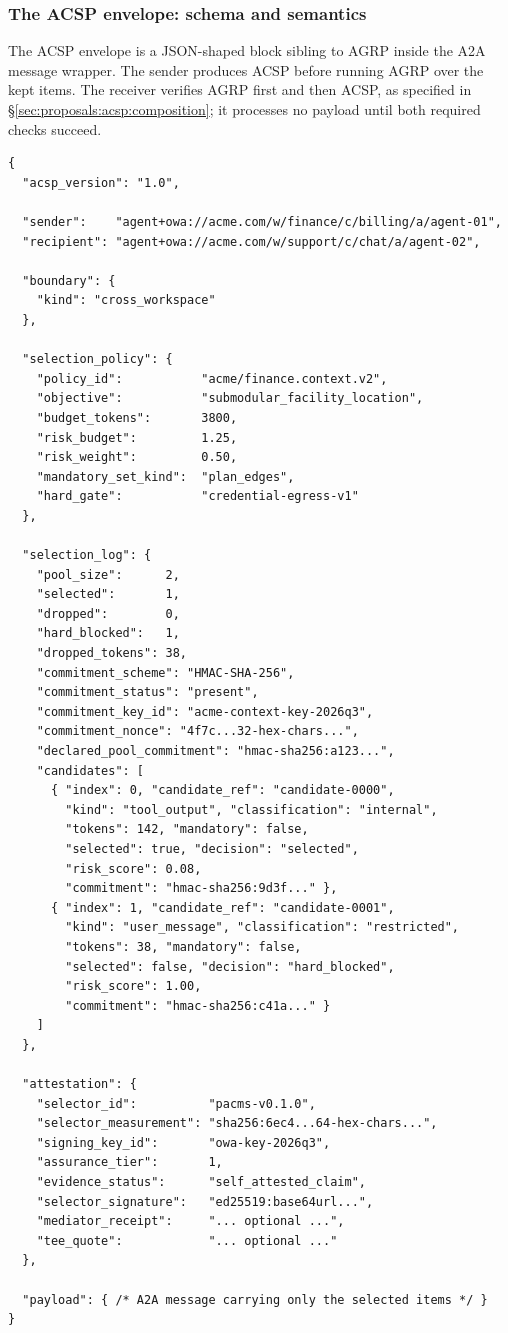 \subsubsection{The ACSP envelope: schema and semantics}
\label{sec:proposals:acsp:envelope}

The ACSP envelope is a JSON-shaped block sibling to AGRP
inside the A2A message wrapper. The sender produces ACSP
before running AGRP over the kept items. The receiver
verifies AGRP first and then ACSP, as specified in
\S\ref{sec:proposals:acsp:composition}; it processes no
payload until both required checks succeed.

\begin{verbatim}
{
  "acsp_version": "1.0",

  "sender":    "agent+owa://acme.com/w/finance/c/billing/a/agent-01",
  "recipient": "agent+owa://acme.com/w/support/c/chat/a/agent-02",

  "boundary": {
    "kind": "cross_workspace"
  },

  "selection_policy": {
    "policy_id":           "acme/finance.context.v2",
    "objective":           "submodular_facility_location",
    "budget_tokens":       3800,
    "risk_budget":         1.25,
    "risk_weight":         0.50,
    "mandatory_set_kind":  "plan_edges",
    "hard_gate":           "credential-egress-v1"
  },

  "selection_log": {
    "pool_size":      2,
    "selected":       1,
    "dropped":        0,
    "hard_blocked":   1,
    "dropped_tokens": 38,
    "commitment_scheme": "HMAC-SHA-256",
    "commitment_status": "present",
    "commitment_key_id": "acme-context-key-2026q3",
    "commitment_nonce": "4f7c...32-hex-chars...",
    "declared_pool_commitment": "hmac-sha256:a123...",
    "candidates": [
      { "index": 0, "candidate_ref": "candidate-0000",
        "kind": "tool_output", "classification": "internal",
        "tokens": 142, "mandatory": false,
        "selected": true, "decision": "selected",
        "risk_score": 0.08,
        "commitment": "hmac-sha256:9d3f..." },
      { "index": 1, "candidate_ref": "candidate-0001",
        "kind": "user_message", "classification": "restricted",
        "tokens": 38, "mandatory": false,
        "selected": false, "decision": "hard_blocked",
        "risk_score": 1.00,
        "commitment": "hmac-sha256:c41a..." }
    ]
  },

  "attestation": {
    "selector_id":          "pacms-v0.1.0",
    "selector_measurement": "sha256:6ec4...64-hex-chars...",
    "signing_key_id":       "owa-key-2026q3",
    "assurance_tier":       1,
    "evidence_status":      "self_attested_claim",
    "selector_signature":   "ed25519:base64url...",
    "mediator_receipt":     "... optional ...",
    "tee_quote":            "... optional ..."
  },

  "payload": { /* A2A message carrying only the selected items */ }
}
\end{verbatim}

